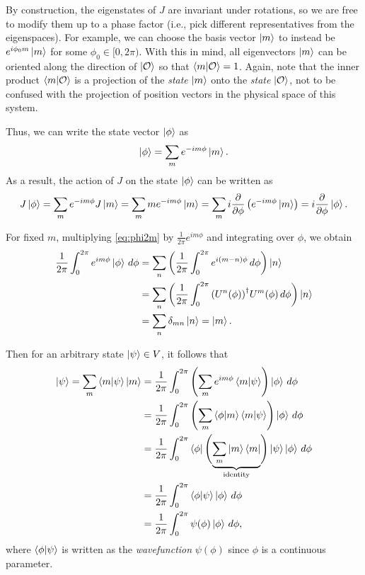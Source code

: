 By construction, the eigenstates of $J$ are invariant under rotations, so we are free to modify them up to a phase factor (i.e., pick  different representatives from the eigenspaces). For example, we can choose the basis vector $\ket{m}$ to instead be $e^{i\phi_0 m}\ket{m}$ for some $\phi_0\in[0,2\pi)$.  With this in mind, all eigenvectors $\ket{m}$ can be oriented along the direction of $\ket{\mathcal{O}}$ so that $\braket{m|\mathcal{O}} = 1$. Again, note that the inner product $\braket{m|\mathcal{O}}$ is a projection of the \textit{state} $\ket{m}$ onto the \textit{state} $\ket{\mathcal{O}}$, not to be confused with the projection of position vectors in the physical space of this system.

Thus, we can write the state vector $\ket{\phi}$ as
\begin{align}
    \ket{\phi} = \sum_{m} e^{-im\phi}\ket{m}.\label{eq:phi2m}
\end{align}
As a result, the action of $J$ on the state $\ket{\phi}$ can be written as
\begin{align*}
    J\ket{\phi} = \sum_{m} e^{-im\phi} J\ket{m} = \sum_{m} m e^{-im\phi}\ket{m} = \sum_{m} i \frac{\partial}{\partial\phi} \left( e^{-im\phi}\ket{m} \right) = i\frac{\partial}{\partial\phi}\ket{\phi}.
\end{align*}

For fixed $m$, multiplying \cref{eq:phi2m} by $\frac{1}{2\pi} e^{im\phi}$ and integrating over $\phi$, we obtain
\begin{align*}
    \frac{1}{2\pi}\int_{0}^{2\pi} e^{im\phi}\ket{\phi} \,d\phi 
        &= \sum_n \left( \frac{1}{2\pi}\int_{0}^{2\pi}e^{i(m-n)\phi}\,d\phi \right)\ket{n} \\
        &= \sum_n \left( \frac{1}{2\pi}\int_{0}^{2\pi}{(U^n(\phi))}^\dagger U^m(\phi)\,d\phi \right)\ket{n} \\
        &= \sum_n \delta_{mn}\ket{n} = \ket{m}.
\end{align*}

Then for an arbitrary state $\ket{\psi}\in V$, it follows that
\begin{align*}
    \ket{\psi} = \sum_m \braket{m|\psi}\ket{m} 
        &= \frac{1}{2\pi}\int_{0}^{2\pi} \left( \sum_m e^{im\phi}\braket{m|\psi} \right)\ket{\phi} \,d\phi \\
        &= \frac{1}{2\pi}\int_{0}^{2\pi} \left( \sum_m \braket{\phi|m}\braket{m|\psi} \right)\ket{\phi} \,d\phi \\
        &= \frac{1}{2\pi}\int_{0}^{2\pi} \bra{\phi}\Biggl( \underbrace{\sum_m \ket{m}\bra{m}}_{\textrm{identity}} \Biggr)\ket{\psi}\ket{\phi} \,d\phi \\
        &= \frac{1}{2\pi}\int_{0}^{2\pi} \braket{\phi|\psi}\ket{\phi} \,d\phi \\
        &= \frac{1}{2\pi}\int_{0}^{2\pi} \psi(\phi)\ket{\phi} \,d\phi,
\end{align*}
where $\braket{\phi|\psi}$ is written as the \textit{wavefunction} $\psi(\phi)$ since $\phi$ is a continuous parameter.

